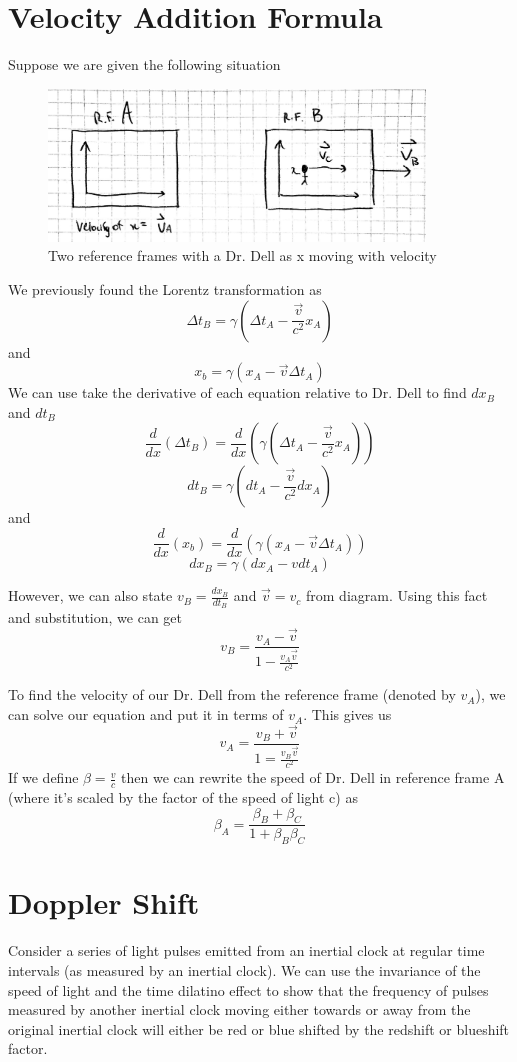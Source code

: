 \documentclass{article}
\begin{document}
\section{Velocity Addition Formula}
\begin{center}
  Suppose we are given the following situation
  \begin{figure}[!htb]
    \centering
    \includegraphics[width=100mm]{velocityaddition}\par
    \caption{Two reference frames with a Dr. Dell as x moving with velocity}
  \end{figure}
  
  We previously found the Lorentz transformation as
  \[
    \Delta t_B = \gamma (\Delta t_A - \frac{\vec{v}}{c^2} x_A)
  \]
  and
  \[
    x_b = \gamma (x_A - \vec{v} \Delta t_A)
  \]
  We can use take the derivative of each equation relative to Dr. Dell to find \(dx_B\) and \(dt_B\)
  \[
    \frac{d}{dx}(\Delta t_B) = \frac{d}{dx}(\gamma (\Delta t_A - \frac{\vec{v}}{c^2} x_A))
  \]
  \[
    dt_B = \gamma (dt_A - \frac{\vec{v}}{c^2} dx_A)
  \]
  and
  \[
    \frac{d}{dx}(x_b) = \frac{d}{dx}(\gamma (x_A - \vec{v} \Delta t_A))
  \]
  \[
    dx_B = \gamma (dx_A - vdt_A)
  \]
  
  However, we can also state \(v_B = \frac{dx_B}{dt_B}\) and \(\vec{v} = v_c\) from diagram. Using this fact and substitution, we can get
  \[
    v_B = \frac{v_A - \vec{v}}{1 - \frac{v_A \vec{v}}{c^2}}
  \]
  
  To find the velocity of our Dr. Dell from the reference frame (denoted by \(v_A\)), we can solve our equation and put it in terms of \(v_A\). This gives us
  \[
    v_A = \frac{v_B + \vec{v}}{1 = \frac{v_B \vec{v}}{c^2}}
  \]
  If we define \(\beta = \frac{v}{c}\) then we can rewrite the speed of Dr. Dell in reference frame A (where it's scaled by the factor of the speed of light c) as
  \[
    \beta_A = \frac{\beta_B + \beta_C}{1 + \beta_B \beta_C}
  \]
\end{center}
\newpage
\section{Doppler Shift}
Consider a series of light pulses emitted from an inertial clock at regular time intervals (as measured by an inertial clock). We can use the invariance of the speed of light and the time dilatino effect to show that the frequency of pulses measured by another inertial clock moving either towards or away from the original inertial clock will either be red or blue shifted by the redshift or blueshift factor.
\end{document}
